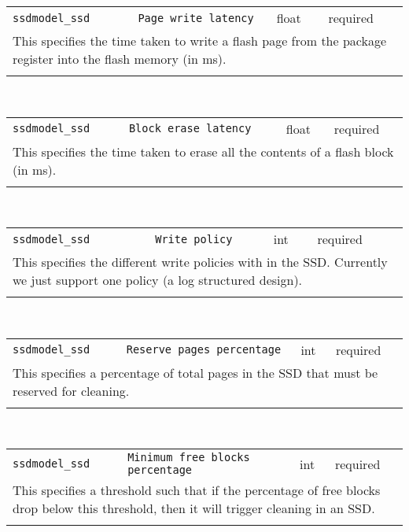 \noindent 
\begin{tabular}{|p{\lpmodwidth}|p{\lpnamewidth}|p{0.5in}|p{0.5in}|}
\cline{1-4}
\texttt{ssdmodel\_ssd} & \texttt{Page write latency} & float & required \\ 
\cline{1-4}
\multicolumn{4}{|p{6in}|}{
This specifies the time taken to write a flash page from the package
register into the flash memory (in ms).
}\\ 
\cline{1-4}
\multicolumn{4}{p{5in}}{}\\
\end{tabular}\\ 
\noindent 
\begin{tabular}{|p{\lpmodwidth}|p{\lpnamewidth}|p{0.5in}|p{0.5in}|}
\cline{1-4}
\texttt{ssdmodel\_ssd} & \texttt{Block erase latency} & float & required \\ 
\cline{1-4}
\multicolumn{4}{|p{6in}|}{
This specifies the time taken to erase all the contents of a flash
block (in ms).
}\\ 
\cline{1-4}
\multicolumn{4}{p{5in}}{}\\
\end{tabular}\\ 
\noindent 
\begin{tabular}{|p{\lpmodwidth}|p{\lpnamewidth}|p{0.5in}|p{0.5in}|}
\cline{1-4}
\texttt{ssdmodel\_ssd} & \texttt{Write policy} & int & required \\ 
\cline{1-4}
\multicolumn{4}{|p{6in}|}{
This specifies the different write policies with in the SSD. Currently
we just support one policy (a log structured design).
}\\ 
\cline{1-4}
\multicolumn{4}{p{5in}}{}\\
\end{tabular}\\ 
\noindent 
\begin{tabular}{|p{\lpmodwidth}|p{\lpnamewidth}|p{0.5in}|p{0.5in}|}
\cline{1-4}
\texttt{ssdmodel\_ssd} & \texttt{Reserve pages percentage} & int & required \\ 
\cline{1-4}
\multicolumn{4}{|p{6in}|}{
This specifies a percentage of total pages in the SSD that must be
reserved for cleaning.
}\\ 
\cline{1-4}
\multicolumn{4}{p{5in}}{}\\
\end{tabular}\\ 
\noindent 
\begin{tabular}{|p{\lpmodwidth}|p{\lpnamewidth}|p{0.5in}|p{0.5in}|}
\cline{1-4}
\texttt{ssdmodel\_ssd} & \texttt{Minimum free blocks percentage} & int & required \\ 
\cline{1-4}
\multicolumn{4}{|p{6in}|}{
This specifies a threshold such that if the percentage of free blocks
drop below this threshold, then it will trigger cleaning in an SSD.
}\\ 
\cline{1-4}
\multicolumn{4}{p{5in}}{}\\
\end{tabular}\\ 
